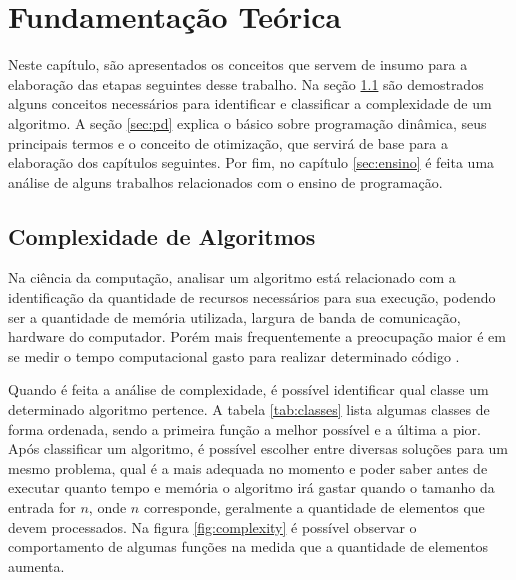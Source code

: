 
\chapter{Fundamentação Teórica}
\label{chap:fundamentacao}

Neste capítulo, são apresentados os conceitos que servem de insumo para a elaboração das etapas seguintes desse trabalho. Na seção \ref{sec:complexidade} são demostrados alguns conceitos necessários para identificar e classificar a complexidade de um algoritmo. A seção \ref{sec:pd} explica o básico sobre programação dinâmica, seus principais termos e o conceito de otimização, que servirá de base para a elaboração dos capítulos seguintes. Por fim, no capítulo \ref{sec:ensino} é feita uma análise de alguns trabalhos relacionados com o ensino de programação.



\section{Complexidade de Algoritmos}
\label{sec:complexidade}
Na ciência da computação, analisar um algoritmo está relacionado com a identificação da quantidade de recursos necessários para sua execução, podendo ser a quantidade de memória utilizada, largura de banda de comunicação, hardware do computador. Porém mais frequentemente a preocupação maior é em se medir o tempo computacional gasto para realizar determinado código \cite{Cormen09a}.

Quando é feita a análise de complexidade, é possível identificar qual classe um determinado algoritmo pertence. A tabela \ref{tab:classes} lista algumas classes de forma ordenada, sendo a primeira função a melhor possível e a última a pior. Após classificar um algoritmo, é possível escolher entre diversas soluções para um mesmo problema, qual é a mais adequada no momento e poder saber antes de executar quanto tempo e memória o algoritmo irá gastar quando o tamanho da entrada for $n$, onde $n$ corresponde, geralmente a quantidade de elementos que devem processados. Na figura \ref{fig:complexity} é possível observar o comportamento de algumas funções na medida que a quantidade de elementos aumenta.


